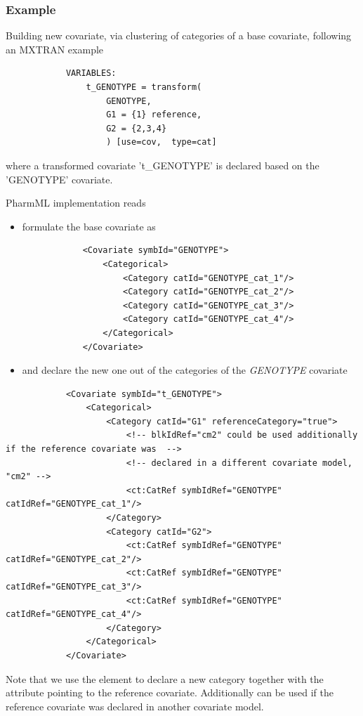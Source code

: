 \subsubsection*{Example} Building new covariate, via clustering of categories of
a base covariate, following an MXTRAN example

\lstset{language=MLX}
\begin{lstlisting}
            VARIABLES: 
            	t_GENOTYPE = transform(
            		GENOTYPE,
            		G1 = {1} reference,
            		G2 = {2,3,4}
            		) [use=cov,  type=cat]
\end{lstlisting}
where a transformed covariate 't\_GENOTYPE' is declared based
on the 'GENOTYPE' covariate.	

\bigskip
PharmML implementation reads
\begin{itemize}
\item 
formulate the base covariate as 
\lstset{language=XML}
\begin{lstlisting}
            <Covariate symbId="GENOTYPE">        
                <Categorical>
                    <Category catId="GENOTYPE_cat_1"/>
                    <Category catId="GENOTYPE_cat_2"/>
                    <Category catId="GENOTYPE_cat_3"/>
                    <Category catId="GENOTYPE_cat_4"/>
                </Categorical>
            </Covariate>
\end{lstlisting}
\item
and declare the new one out of the categories of the \emph{GENOTYPE} covariate
\end{itemize}
\lstset{language=XML}
\begin{lstlisting}            
            <Covariate symbId="t_GENOTYPE">        
                <Categorical>
                    <Category catId="G1" referenceCategory="true">
                        <!-- blkIdRef="cm2" could be used additionally if the reference covariate was  -->
                        <!-- declared in a different covariate model, "cm2" -->
                        <ct:CatRef symbIdRef="GENOTYPE" catIdRef="GENOTYPE_cat_1"/>
                    </Category>
                    <Category catId="G2">
                        <ct:CatRef symbIdRef="GENOTYPE" catIdRef="GENOTYPE_cat_2"/>
                        <ct:CatRef symbIdRef="GENOTYPE" catIdRef="GENOTYPE_cat_3"/>
                        <ct:CatRef symbIdRef="GENOTYPE" catIdRef="GENOTYPE_cat_4"/>
                    </Category>
                </Categorical>
            </Covariate>
\end{lstlisting}
Note that we use the  element to declare a new category 
together with the  attribute pointing to the reference covariate.
Additionally  can be used if the reference covariate was declared 
in another covariate model.

